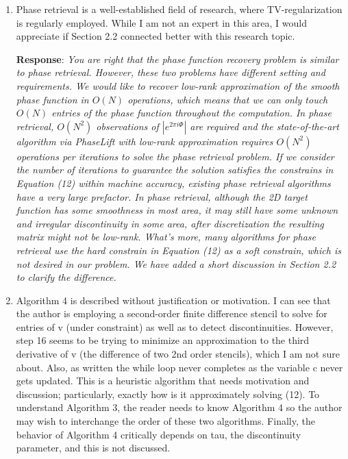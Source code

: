 \documentclass[11pt]{article}
\newcommand{\Response}{{\bf Response}}
\begin{document}
\begin{enumerate}
\item Phase retrieval is a well-established field of research, where TV-regularization is regularly employed. While I am not an expert in this area, I would appreciate if Section 2.2 connected better with this research topic.


\Response: {\it You are right that the phase function recovery problem is similar to phase retrieval. However, these two problems have different setting and requirements. We would like to recover low-rank approximation of the smooth phase function in $O(N)$ operations, which means that we can only touch $O(N)$ entries of the phase function throughout the computation. In phase retrieval, $O(N^2)$ observations of $|e^{2\pi i\Phi}|$ are required and the state-of-the-art algorithm via PhaseLift with low-rank approximation requires $O(N^2)$ operations per iterations to solve the phase retrieval problem. If we consider the number of iterations to guarantee the solution satisfies the constrains in Equation (12) within machine accuracy, existing phase retrieval algorithms have a very large prefactor. In phase retrieval, although the 2D target function has some smoothness in most area, it may still have some unknown and irregular discontinuity in some area, after discretization the resulting matrix might not be low-rank. What's more, many algorithms for phase retrieval use the hard constrain in Equation (12) as a soft constrain, which is not desired in our problem. We have added a short discussion in Section 2.2 to clarify the difference.
}

\item Algorithm 4 is described without justification or motivation.  I can see that the author is employing a second-order finite difference stencil to solve for entries of v (under constraint) as well as to detect discontinuities. However, step 16 seems to be trying to minimize an approximation to the third derivative of v (the difference of two 2nd order stencils), which I am not sure about. Also, as written the while loop never completes as the variable c never gets updated. This is a heuristic algorithm that needs motivation and discussion; particularly, exactly how is it approximately solving (12). To understand Algorithm 3, the reader needs to know Algorithm 4 so the author may wish to interchange the order of these two algorithms. Finally, the behavior of Algorithm 4 critically depends on tau, the discontinuity parameter, and this is not discussed. 


\end{enumerate}
\end{document}
